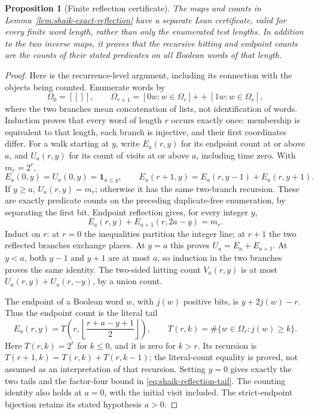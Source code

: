 \documentclass[11pt]{article}
\newtheorem{proposition}{Proposition}
\theoremstyle{remark}\newtheorem{remark}[proposition]{Remark}
\newcommand{\one}{\mathbf 1}
\begin{document}
\begin{proposition}[Finite reflection certificate]\label{prop:shaik-reflection-certificate}
The maps and counts in Lemma~\ref{lem:shaik-exact-reflection} have a
separate Lean certificate, valid for every finite word length, rather
than only the enumerated test lengths. In addition to the two inverse
maps, it proves that the recursive hitting and endpoint counts are
the counts of their stated predicates on all Boolean words of that length.
\end{proposition}
\begin{proof}
Here is the recurrence-level argument, including its connection with
the objects being counted. Enumerate words by
\[
 \Omega_0=[[]],\qquad
 \Omega_{r+1}=[0w:w\in\Omega_r]\mathbin{+\!\!+}[1w:w\in\Omega_r],
\]
where the two branches mean concatenation of lists, not identification
of words. Induction proves that every word of length \(r\) occurs
exactly once: membership is equivalent to that length, each branch
is injective, and their first coordinates differ.
For a walk starting at \(y\), write \(E_a(r,y)\) for its endpoint
count at or above \(a\), and \(U_a(r,y)\) for its count of visits
at or above \(a\), including time zero. With \(m_r=2^r\),
\[
 E_a(0,y)=U_a(0,y)=\one_{a\le y},\qquad
 E_a(r+1,y)=E_a(r,y-1)+E_a(r,y+1).
\]
If \(y\ge a\), \(U_a(r,y)=m_r\); otherwise it has the same two-branch
recursion. These are exactly predicate counts on the preceding
duplicate-free enumeration, by separating the first bit.
Endpoint reflection gives, for every integer \(y\),
\[
 E_a(r,y)+E_{a+1}(r,2a-y)=m_r.
\]
Induct on \(r\): at \(r=0\) the inequalities partition the integer
line; at \(r+1\) the two reflected branches exchange places.
At \(y=a\) this proves \(U_a=E_a+E_{a+1}\). At \(y<a\), both
\(y-1\) and \(y+1\) are at most \(a\), so induction in the two
branches proves the same identity. The two-sided hitting count
\(V_a(r,y)\) is at most \(U_a(r,y)+U_a(r,-y)\), by a union count.

The endpoint of a Boolean word \(w\), with \(j(w)\) positive bits,
is \(y+2j(w)-r\). Thus the endpoint count is the literal tail
\[
 E_a(r,y)=T\!\left(r,\left\lfloor
                    \frac{r+a-y+1}{2}\right\rfloor\right),
 \qquad T(r,k)=\#\{w\in\Omega_r:j(w)\ge k\}.
\]
Here \(T(r,k)=2^r\) for \(k\le0\), and it is zero for \(k>r\).
Its recursion is \(T(r+1,k)=T(r,k)+T(r,k-1)\); the literal-count
equality is proved, not assumed as an interpretation of that recursion.
Setting \(y=0\) gives exactly the two tails and the factor-four bound
in \eqref{eq:shaik-reflection-tail}. The counting identity also holds
at \(a=0\), with the initial visit included. The strict-endpoint
bijection retains its stated hypothesis \(a>0\).
\end{proof}
\end{document}

